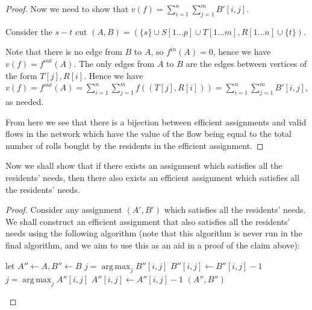 \documentclass[answers]{exam}
\DeclareMathOperator*{\argmax}{arg\,max}
\begin{document}
\begin{questions}
\begin{solution}
\begin{proof}
Now we need to show that $v(f) = \sum_{i = 1}^n \sum_{j = 1}^m B'[i, j]$.

Consider the $s-t$ cut $(A, B) = (\{s\} \cup S[1 \ldots p] \cup T[1 \ldots m], R[1 \ldots n] \cup \{t\})$.

Note that there is no edge from $B$ to $A$, so $f^{in}(A) = 0$, hence we have $v(f) = f^{out}(A)$. The only edges from $A$ to $B$ are the edges between vertices of the form $T[j], R[i]$. Hence we have $v(f) = f^{out}(A) = \sum_{i = 1}^n \sum_{j = 1}^m f((T[j], R[i])) = \sum_{i = 1}^n \sum_{j = 1}^m B'[i, j]$, as needed.

From here we see that there is a bijection between efficient assignments and valid flows in the network which have the value of the flow being equal to the total number of rolls bought by the residents in the efficient assignment.

\end{proof}

Now we shall show that if there exists an assignment which satisfies all the residents' needs, then there also exists an efficient assignment which satisfies all the residents' needs.

\begin{proof}
Consider any assignment $(A', B')$ which satisfies all the residents' needs. We shall construct an efficient assignment that also satisfies all the residents' needs using the following algorithm (note that this algorithm is never run in the final algorithm, and we aim to use this as an aid in a proof of the claim above):

\begin{algorithmic}[1]
        \State let $A'' \gets A, B'' \gets B$
                \State $j = \argmax_{j} B''[i, j]$
                \State $B''[i, j] \gets B''[i, j] - 1$
            \EndWhile
        \EndFor
                \State $j = \argmax_{j} A''[i, j]$
                \State $A''[i, j] \gets A''[i, j] - 1$
            \EndWhile
        \EndFor
        \State \Return $(A'', B'')$
    \EndFunction
\end{algorithmic}


\end{proof}
\end{solution}
\end{questions}
\end{document}
